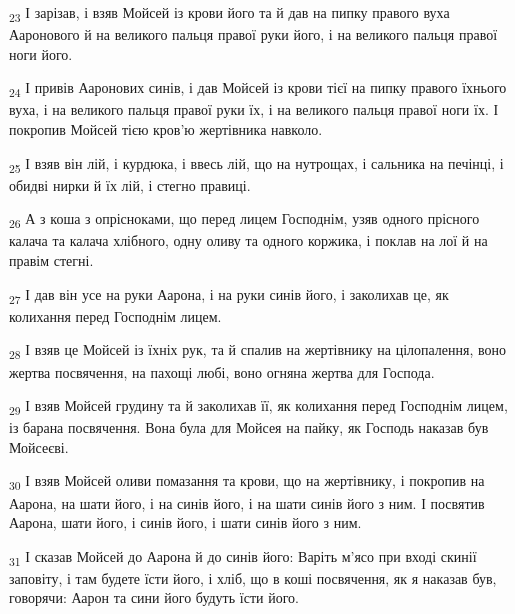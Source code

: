 \begin{tcolorbox}
\textsubscript{23} І зарізав, і взяв Мойсей із крови його та й дав на пипку правого вуха Ааронового й на великого пальця правої руки його, і на великого пальця правої ноги його.
\end{tcolorbox}
\begin{tcolorbox}
\textsubscript{24} І привів Ааронових синів, і дав Мойсей із крови тієї на пипку правого їхнього вуха, і на великого пальця правої руки їх, і на великого пальця правої ноги їх. І покропив Мойсей тією кров'ю жертівника навколо.
\end{tcolorbox}
\begin{tcolorbox}
\textsubscript{25} І взяв він лій, і курдюка, і ввесь лій, що на нутрощах, і сальника на печінці, і обидві нирки й їх лій, і стегно правиці.
\end{tcolorbox}
\begin{tcolorbox}
\textsubscript{26} А з коша з опрісноками, що перед лицем Господнім, узяв одного прісного калача та калача хлібного, одну оливу та одного коржика, і поклав на лої й на правім стегні.
\end{tcolorbox}
\begin{tcolorbox}
\textsubscript{27} І дав він усе на руки Аарона, і на руки синів його, і заколихав це, як колихання перед Господнім лицем.
\end{tcolorbox}
\begin{tcolorbox}
\textsubscript{28} І взяв це Мойсей із їхніх рук, та й спалив на жертівнику на цілопалення, воно жертва посвячення, на пахощі любі, воно огняна жертва для Господа.
\end{tcolorbox}
\begin{tcolorbox}
\textsubscript{29} І взяв Мойсей грудину та й заколихав її, як колихання перед Господнім лицем, із барана посвячення. Вона була для Мойсея на пайку, як Господь наказав був Мойсеєві.
\end{tcolorbox}
\begin{tcolorbox}
\textsubscript{30} І взяв Мойсей оливи помазання та крови, що на жертівнику, і покропив на Аарона, на шати його, і на синів його, і на шати синів його з ним. І посвятив Аарона, шати його, і синів його, і шати синів його з ним.
\end{tcolorbox}
\begin{tcolorbox}
\textsubscript{31} І сказав Мойсей до Аарона й до синів його: Варіть м'ясо при вході скинії заповіту, і там будете їсти його, і хліб, що в коші посвячення, як я наказав був, говорячи: Аарон та сини його будуть їсти його.
\end{tcolorbox}
